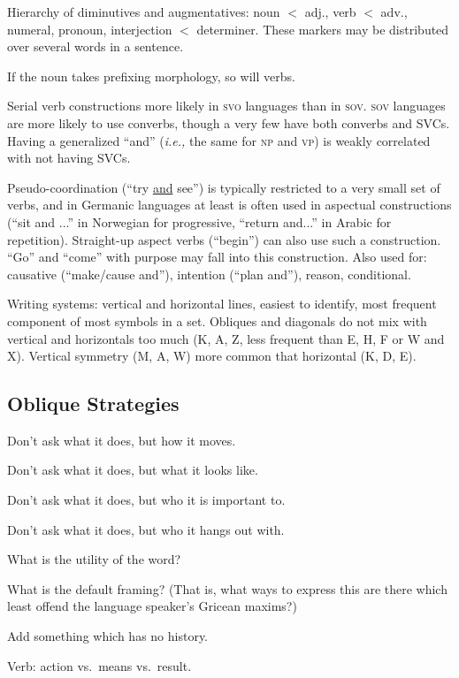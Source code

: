\documentclass[11pt]{article}
\newcommand{\I}[1]{\textsc{#1}}   %
\begin{document}
{Hierarchy of diminutives and augmentatives: noun $<$ adj., verb $<$
adv., numeral, pronoun, interjection $<$ determiner.  These markers
may be distributed over several words in a sentence.

If the noun takes prefixing morphology, so will verbs.

Serial verb constructions more likely in \I{svo} languages than in
\I{sov}.  \I{sov} languages are more likely to use converbs, though a
very few have both converbs and SVCs.  Having a generalized ``and''
(\textit{i.e.,} the same for \I{np} and \I{vp}) is weakly correlated
with not having SVCs.

Pseudo-coordination (``try \uline{and} see'') is typically restricted
to a very small set of verbs, and in Germanic languages at least is
often used in aspectual constructions (``sit and ...'' in Norwegian
for progressive, ``return and...'' in Arabic for repetition).
Straight-up aspect verbs (``begin'') can also use such a
construction. ``Go'' and ``come'' with purpose may fall into this
construction.  Also used for: causative (``make/cause and''),
intention (``plan and''), reason, conditional.

Writing systems: vertical and horizontal lines, easiest to identify,
most frequent component of most symbols in a set. Obliques and
diagonals do not mix with vertical and horizontals too much (K, A, Z,
less frequent than E, H, F or W and X). Vertical symmetry (M, A, W)
more common that horizontal (K, D, E).

\subsection{Oblique Strategies}
Don't ask what it does, but how it moves.

Don't ask what it does, but what it looks like.

Don't ask what it does, but who it is important to.

Don't ask what it does, but who it hangs out with.

What is the utility of the word?

What is the default framing?  (That is, what ways to express this are
there which least offend the language speaker's Gricean maxims?)

Add something which has no history.

Verb: action vs.\ means vs.\ result.

}
\end{document}
